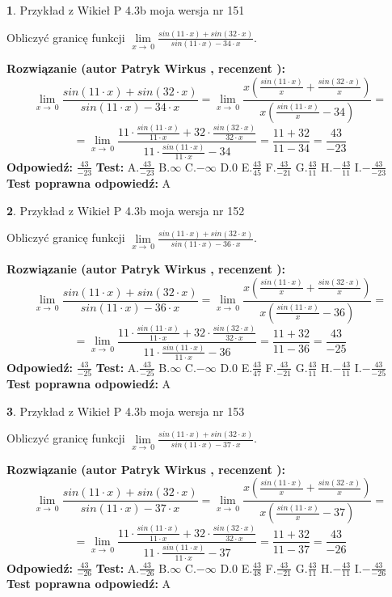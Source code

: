 \documentclass[12pt, a4paper]{article}
\theoremstyle{definition} %
\newtheorem{zad}{}
\newcommand{\zadStart}[1]{\begin{zad}#1\newline}
\newcommand{\zadStop}{\end{zad}}
\newcommand{\rozwStart}[2]{\noindent \textbf{Rozwiązanie (autor #1 , recenzent #2): }\newline}
\newcommand{\rozwStop}{\newline}
\newcommand{\odpStart}{\noindent \textbf{Odpowiedź:}\newline}
\newcommand{\odpStop}{\newline}
\newcommand{\testStart}{\noindent \textbf{Test:}\newline}
\newcommand{\testStop}{\newline}
\newcommand{\kluczStart}{\noindent \textbf{Test poprawna odpowiedź:}\newline}
\newcommand{\kluczStop}{\newline}
\begin{document}
\zadStart{Przykład z Wikieł P 4.3b moja wersja nr 151}


Obliczyć granicę funkcji $\lim\limits_{x\to\ 0}\frac{sin(11 \cdot x)+sin(32 \cdot x)}{sin(11 \cdot x)-34 \cdot x}$.
\zadStop
\rozwStart{Patryk Wirkus}{}
$$\lim\limits_{x\to\ 0}\frac{sin(11 \cdot x)+sin(32 \cdot x)}{sin(11 \cdot x)-34 \cdot x}=\lim\limits_{x\to\ 0}\frac{x(\frac{sin(11 \cdot x)}{x}+\frac{sin(32 \cdot x)}{x})}{x(\frac{sin(11 \cdot x)}{x}-34)}=$$
$$=\lim\limits_{x\to\ 0}\frac{11 \cdot \frac{sin(11 \cdot x)}{11 \cdot x}+32 \cdot \frac{sin(32 \cdot x)}{32 \cdot x}}{11 \cdot \frac{sin(11 \cdot x)}{11 \cdot x}-34}=\frac{11+32}{11-34} = \frac{43}{-23}$$
\rozwStop
\odpStart
$\frac{43}{-23}$
\odpStop
\testStart
A.$\frac{43}{-23}$
B.$\infty$
C.$-\infty$
D.$0$
E.$\frac{43}{45}$
F.$\frac{43}{-21}$
G.$\frac{43}{11}$
H.$-\frac{43}{11}$
I.$-\frac{43}{-23}$
\testStop
\kluczStart
A
\kluczStop



\zadStart{Przykład z Wikieł P 4.3b moja wersja nr 152}


Obliczyć granicę funkcji $\lim\limits_{x\to\ 0}\frac{sin(11 \cdot x)+sin(32 \cdot x)}{sin(11 \cdot x)-36 \cdot x}$.
\zadStop
\rozwStart{Patryk Wirkus}{}
$$\lim\limits_{x\to\ 0}\frac{sin(11 \cdot x)+sin(32 \cdot x)}{sin(11 \cdot x)-36 \cdot x}=\lim\limits_{x\to\ 0}\frac{x(\frac{sin(11 \cdot x)}{x}+\frac{sin(32 \cdot x)}{x})}{x(\frac{sin(11 \cdot x)}{x}-36)}=$$
$$=\lim\limits_{x\to\ 0}\frac{11 \cdot \frac{sin(11 \cdot x)}{11 \cdot x}+32 \cdot \frac{sin(32 \cdot x)}{32 \cdot x}}{11 \cdot \frac{sin(11 \cdot x)}{11 \cdot x}-36}=\frac{11+32}{11-36} = \frac{43}{-25}$$
\rozwStop
\odpStart
$\frac{43}{-25}$
\odpStop
\testStart
A.$\frac{43}{-25}$
B.$\infty$
C.$-\infty$
D.$0$
E.$\frac{43}{47}$
F.$\frac{43}{-21}$
G.$\frac{43}{11}$
H.$-\frac{43}{11}$
I.$-\frac{43}{-25}$
\testStop
\kluczStart
A
\kluczStop



\zadStart{Przykład z Wikieł P 4.3b moja wersja nr 153}


Obliczyć granicę funkcji $\lim\limits_{x\to\ 0}\frac{sin(11 \cdot x)+sin(32 \cdot x)}{sin(11 \cdot x)-37 \cdot x}$.
\zadStop
\rozwStart{Patryk Wirkus}{}
$$\lim\limits_{x\to\ 0}\frac{sin(11 \cdot x)+sin(32 \cdot x)}{sin(11 \cdot x)-37 \cdot x}=\lim\limits_{x\to\ 0}\frac{x(\frac{sin(11 \cdot x)}{x}+\frac{sin(32 \cdot x)}{x})}{x(\frac{sin(11 \cdot x)}{x}-37)}=$$
$$=\lim\limits_{x\to\ 0}\frac{11 \cdot \frac{sin(11 \cdot x)}{11 \cdot x}+32 \cdot \frac{sin(32 \cdot x)}{32 \cdot x}}{11 \cdot \frac{sin(11 \cdot x)}{11 \cdot x}-37}=\frac{11+32}{11-37} = \frac{43}{-26}$$
\rozwStop
\odpStart
$\frac{43}{-26}$
\odpStop
\testStart
A.$\frac{43}{-26}$
B.$\infty$
C.$-\infty$
D.$0$
E.$\frac{43}{48}$
F.$\frac{43}{-21}$
G.$\frac{43}{11}$
H.$-\frac{43}{11}$
I.$-\frac{43}{-26}$
\testStop
\kluczStart
A
\kluczStop
\end{document}
